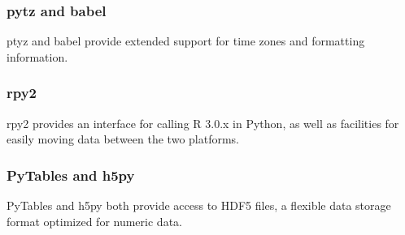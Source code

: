 \documentclass[MASTER.tex]{subfiles}
\begin{document}
\begin{frame}
	\frametitle{pytz and babel}
ptyz and babel provide extended support for time zones and formatting information.
\end{frame}
\begin{frame}
	\frametitle{rpy2 }
rpy2 provides an interface for calling R 3.0.x in Python, as well as facilities for easily moving data between
the two platforms.
\end{frame}
\begin{frame}
	\frametitle{ PyTables and h5py }
PyTables and h5py both provide access to HDF5 files, a flexible data storage format optimized for numeric
data.
\end{frame}
\end{document}
